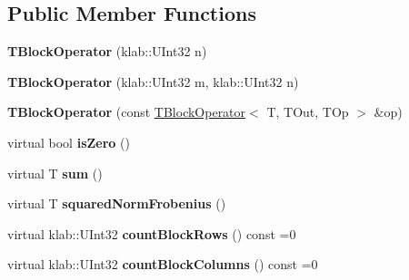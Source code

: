\subsection*{Public Member Functions}
\begin{DoxyCompactItemize}
\item 
{\bfseries T\+Block\+Operator} (klab\+::\+U\+Int32 n)\hypertarget{classkl1p_1_1TBlockOperator_a5dc354ba1f729db43de46140a32e3026}{}\label{classkl1p_1_1TBlockOperator_a5dc354ba1f729db43de46140a32e3026}

\item 
{\bfseries T\+Block\+Operator} (klab\+::\+U\+Int32 m, klab\+::\+U\+Int32 n)\hypertarget{classkl1p_1_1TBlockOperator_a582054d812e2fa198041c0f4b49650f9}{}\label{classkl1p_1_1TBlockOperator_a582054d812e2fa198041c0f4b49650f9}

\item 
{\bfseries T\+Block\+Operator} (const \hyperlink{classkl1p_1_1TBlockOperator}{T\+Block\+Operator}$<$ T, T\+Out, T\+Op $>$ \&op)\hypertarget{classkl1p_1_1TBlockOperator_a6f125a341d84ddecd00aee2ac163b869}{}\label{classkl1p_1_1TBlockOperator_a6f125a341d84ddecd00aee2ac163b869}

\item 
virtual bool {\bfseries is\+Zero} ()\hypertarget{classkl1p_1_1TBlockOperator_a0dc821bb4c6b6a4d83f8116980068361}{}\label{classkl1p_1_1TBlockOperator_a0dc821bb4c6b6a4d83f8116980068361}

\item 
virtual T {\bfseries sum} ()\hypertarget{classkl1p_1_1TBlockOperator_af94660a9ae9a441e534242d8a1341324}{}\label{classkl1p_1_1TBlockOperator_af94660a9ae9a441e534242d8a1341324}

\item 
virtual T {\bfseries squared\+Norm\+Frobenius} ()\hypertarget{classkl1p_1_1TBlockOperator_a6bf4b8cceb7591a14910178adc41399e}{}\label{classkl1p_1_1TBlockOperator_a6bf4b8cceb7591a14910178adc41399e}

\item 
virtual klab\+::\+U\+Int32 {\bfseries count\+Block\+Rows} () const =0\hypertarget{classkl1p_1_1TBlockOperator_a11b06e07e2caddb5ce6e02b84ee1f9a7}{}\label{classkl1p_1_1TBlockOperator_a11b06e07e2caddb5ce6e02b84ee1f9a7}

\item 
virtual klab\+::\+U\+Int32 {\bfseries count\+Block\+Columns} () const =0\hypertarget{classkl1p_1_1TBlockOperator_a3ee4a1fcb3ccb494cb2fac7cc2d454ee}{}\label{classkl1p_1_1TBlockOperator_a3ee4a1fcb3ccb494cb2fac7cc2d454ee}


\end{DoxyCompactItemize}
